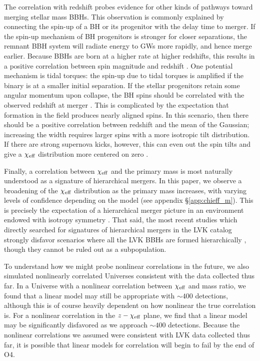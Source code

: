 \begin{refsection}
The correlation with redshift probes evidence for other kinds of pathways toward merging stellar mass BBHs. This observation is commonly explained by connecting the spin-up of a BH or its progenitor with the delay time to merger. If the spin-up mechanism of BH progenitors is stronger for closer separations, the remnant \ac{BBH} system will radiate energy to GWs more rapidly, and hence merge earlier. Because \acp{BBH} are born at a higher rate at higher redshifts, this results in a positive correlation between spin magnitude and redshift \cite{Zaldarriaga:2017qkw,Bavera:2020inc,Bavera:2021evk,Fuller:2022ysb}. One potential mechanism is tidal torques: the spin-up due to tidal torques is amplified if the binary is at a smaller initial separation. If the stellar progenitors retain some angular momentum upon collapse, the BH spins should be correlated with the observed redshift at merger \cite{Qin:2018vaa, Fuller:2019sxi, Bavera:2022mef}. This is complicated by the expectation that formation in the field produces nearly aligned spins. In this scenario, then there should be a positive correlation between redshift and the mean of the Gaussian; increasing the width requires larger spins with a more isotropic tilt distribution. If there are strong supernova kicks, however, this can even out the spin tilts and give a $\chi_{\rm eff}$ distribution more centered on zero \cite{Rodriguez:2016vmx, Gerosa:2018wbw, Callister:2020vyz, Stevenson:2022hmi}.

Finally, a correlation between $\chi_{\rm eff}$ and the primary mass is most naturally understood as a signature of hierarchical mergers. In this paper, we observe a broadening of the $\chi_{\rm eff}$ distribution as the primary mass increases, with varying levels of confidence depending on the model (see appendix \S \ref{app:chieff_m}). This is precisely the expectation of a hierarchical merger picture in an environment endowed with isotropy symmetry \cite{Gerosa:2021mno, Gerosa:2017kvu, Fishbach:2017dwv, Tagawa:2021ofj}. That said, the most recent studies which directly searched for signatures of hierarchical mergers in the \ac{LVK} catalog strongly disfavor scenarios where all the \ac{LVK} BBHs are formed hierarchically \cite{Fishbach:2022lzq, Doctor:2019ruh, Kimball:2020opk}, though they cannot be ruled out as a subpopulation.

To understand how we might probe nonlinear correlations in the future, we also simulated nonlinearly correlated Universes consistent with the data collected thus far. In a Universe with a nonlinear correlation between $\chi_{\rm eff}$ and mass ratio, we found that a linear model may still be appropriate with $\sim 400$ detections, although this is of course heavily dependent on how nonlinear the true correlation is. For a nonlinear correlation in the $z-\chi_{\rm eff}$ plane, we find that a linear model may be significantly disfavored as we approach $\sim 400$ detections. Because the nonlinear correlations we assumed were consistent with \ac{LVK} data collected thus far, it is possible that linear models for correlation will begin to fail by the end of O4. 


\end{refsection}
